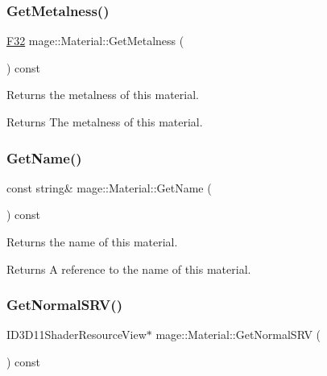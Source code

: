 \subsubsection{\texorpdfstring{Get\+Metalness()}{GetMetalness()}}
{\footnotesize\ttfamily \hyperlink{namespacemage_aa97e833b45f06d60a0a9c4fc22ae02c0}{F32} mage\+::\+Material\+::\+Get\+Metalness (\begin{DoxyParamCaption}{ }\end{DoxyParamCaption}) const\hspace{0.3cm}{\ttfamily [noexcept]}}

Returns the metalness of this material.

\begin{DoxyReturn}{Returns}
The metalness of this material. 
\end{DoxyReturn}
\hypertarget{classmage_1_1_material_a9edb2f437eca07c6c12c24d10ec30eb3}{}\label{classmage_1_1_material_a9edb2f437eca07c6c12c24d10ec30eb3} 
\subsubsection{\texorpdfstring{Get\+Name()}{GetName()}}
{\footnotesize\ttfamily const string\& mage\+::\+Material\+::\+Get\+Name (\begin{DoxyParamCaption}{ }\end{DoxyParamCaption}) const\hspace{0.3cm}{\ttfamily [noexcept]}}

Returns the name of this material.

\begin{DoxyReturn}{Returns}
A reference to the name of this material. 
\end{DoxyReturn}
\hypertarget{classmage_1_1_material_a0be98911c56dedaa4fd2f8714fc8a793}{}\label{classmage_1_1_material_a0be98911c56dedaa4fd2f8714fc8a793} 
\subsubsection{\texorpdfstring{Get\+Normal\+S\+R\+V()}{GetNormalSRV()}}
{\footnotesize\ttfamily I\+D3\+D11\+Shader\+Resource\+View$\ast$ mage\+::\+Material\+::\+Get\+Normal\+S\+RV (\begin{DoxyParamCaption}{ }\end{DoxyParamCaption}) const\hspace{0.3cm}{\ttfamily [noexcept]}}


